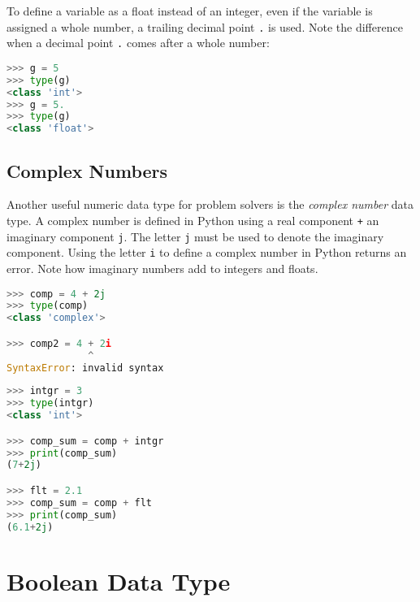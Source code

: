 \documentclass{book}
\newcommand{\passthrough}[1]{#1}
\begin{document}
To define a variable as a float instead of an integer, even if the
variable is assigned a whole number, a trailing decimal point
\passthrough{\lstinline!.!} is used. Note the difference when a decimal
point \passthrough{\lstinline!.!} comes after a whole number:

\begin{lstlisting}[language=Python]
>>> g = 5
>>> type(g)
<class 'int'>
>>> g = 5.
>>> type(g)
<class 'float'>
\end{lstlisting}
    




    
        \hypertarget{complex-numbers}{%
\subsection{Complex Numbers}\label{complex-numbers}}

Another useful numeric data type for problem solvers is the
\emph{complex number} data type. A complex number is defined in Python
using a real component \passthrough{\lstinline!+!} an imaginary
component \passthrough{\lstinline!j!}. The letter
\passthrough{\lstinline!j!} must be used to denote the imaginary
component. Using the letter \passthrough{\lstinline!i!} to define a
complex number in Python returns an error. Note how imaginary numbers
add to integers and floats.

\begin{lstlisting}[language=Python]
>>> comp = 4 + 2j
>>> type(comp)
<class 'complex'>

>>> comp2 = 4 + 2i
              ^
SyntaxError: invalid syntax
\end{lstlisting}

\begin{lstlisting}[language=Python]
>>> intgr = 3
>>> type(intgr)
<class 'int'>

>>> comp_sum = comp + intgr
>>> print(comp_sum)
(7+2j)

>>> flt = 2.1
>>> comp_sum = comp + flt
>>> print(comp_sum)
(6.1+2j)
\end{lstlisting}
    




    
        \hypertarget{boolean-data-type}{%
\section{Boolean Data Type}\label{boolean-data-type}}
    
\end{document}
